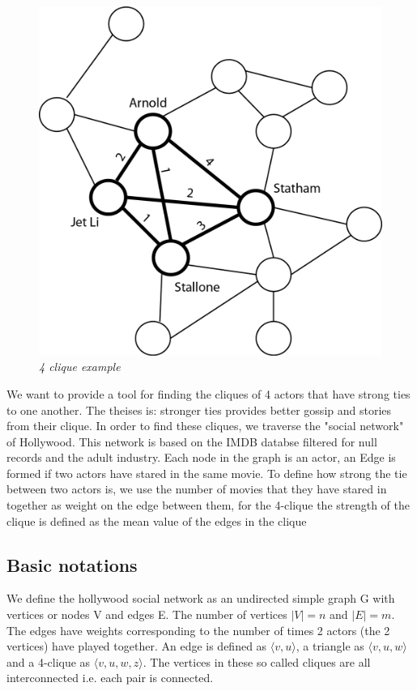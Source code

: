 \documentclass{article}
\begin{document}
\begin{figure}[H]
\begin{center}
\includegraphics[scale=0.45]{graph_4clique.png}
\end{center}
\caption{\small {\it {4 clique example}}} 
\label{fig:4 clique example}
\end{figure}

We want to provide a tool for finding the cliques of 4 actors that have strong ties to one another. The theises is: stronger ties provides better gossip and stories from their clique. In order to find these cliques, we traverse the "social network" of Hollywood. This network is based on the IMDB databse filtered for null records and the adult industry.
Each node in the graph is an actor, an Edge is formed if two actors have stared in the same movie.
To define how strong the tie between two actors is, we use the number of movies that they have stared in together as weight on the edge between them, for the 4-clique the strength of the clique is defined as the mean value of the edges in the clique

\subsection{Basic notations}
We define the hollywood social network as an undirected simple graph G with vertices or nodes V and edges E. The number of vertices $|V| = n$ and $|E| = m$. The edges have weights corresponding to the number of times 2 actors (the 2 vertices) have played together. An edge is defined as $\langle v,u\rangle$, a triangle as $\langle v,u,w\rangle$ and a 4-clique as $\langle v,u,w,z\rangle$. The vertices in these so called cliques are all interconnected i.e. each pair is connected.
\end{document}
